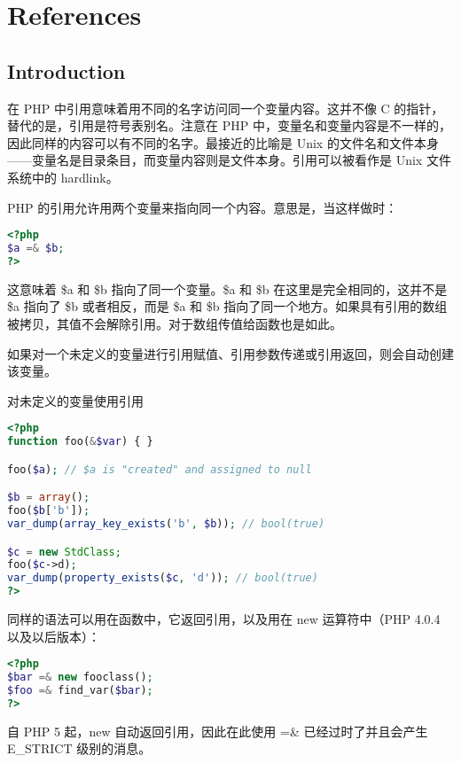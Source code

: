 \part{References}


\chapter{Introduction}


在 PHP 中引用意味着用不同的名字访问同一个变量内容。这并不像 C 的指针，替代的是，引用是符号表别名。注意在 PHP 中，变量名和变量内容是不一样的，因此同样的内容可以有不同的名字。最接近的比喻是 Unix 的文件名和文件本身——变量名是目录条目，而变量内容则是文件本身。引用可以被看作是 Unix 文件系统中的 hardlink。

PHP 的引用允许用两个变量来指向同一个内容。意思是，当这样做时：

\begin{lstlisting}[language=PHP]
<?php
$a =& $b;
?>
\end{lstlisting}

这意味着 \$a 和 \$b 指向了同一个变量。\$a 和 \$b 在这里是完全相同的，这并不是 \$a 指向了 \$b 或者相反，而是 \$a 和 \$b 指向了同一个地方。如果具有引用的数组被拷贝，其值不会解除引用。对于数组传值给函数也是如此。

如果对一个未定义的变量进行引用赋值、引用参数传递或引用返回，则会自动创建该变量。




\begin{example}
对未定义的变量使用引用
\begin{lstlisting}[language=PHP]
<?php
function foo(&$var) { }

foo($a); // $a is "created" and assigned to null

$b = array();
foo($b['b']);
var_dump(array_key_exists('b', $b)); // bool(true)

$c = new StdClass;
foo($c->d);
var_dump(property_exists($c, 'd')); // bool(true)
?>
\end{lstlisting}
\end{example}

同样的语法可以用在函数中，它返回引用，以及用在 new 运算符中（PHP 4.0.4 以及以后版本）：

\begin{lstlisting}[language=PHP]
<?php
$bar =& new fooclass();
$foo =& find_var($bar);
?>
\end{lstlisting}


自 PHP 5 起，new 自动返回引用，因此在此使用 =\& 已经过时了并且会产生 E\_STRICT 级别的消息。

